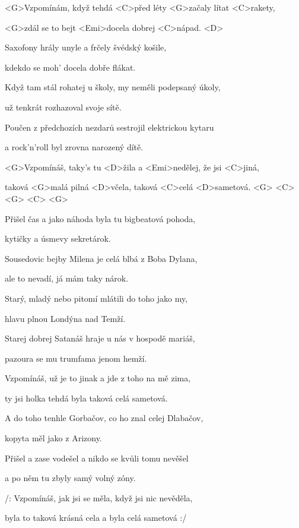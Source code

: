 

\zs
<G>Vzpomínám, když tehdá <C>před léty
<G>začaly lítat <C>rakety,

<G>zdál se to bejt <Emi>docela dobrej <C>nápad. <D>

Saxofony hrály unyle a frčely švédský košile,

kdekdo se moh' docela dobře flákat.
\ks

\zs
Když tam stál rohatej u školy, my neměli podepsaný úkoly,

už tenkrát rozhazoval svoje sítě.

Poučen z předchozích nezdarů sestrojil elektrickou kytaru

a rock'n'roll byl zrovna narozený dítě.
\ks

\zr
<G>Vzpomínáš, taky's tu <D>žila a <Emi>nedělej, že jsi <C>jiná,

taková <G>malá pilná <D>včela, taková <C>celá <D>sametová. <G> <C> <G> <C> <G>
\kr

\zs
Přišel čas a jako náhoda byla tu bigbeatová pohoda,

kytičky a úsmevy sekretárok.

Sousedovic bejby Milena je celá blbá z Boba Dylana,

ale to nevadí, já mám taky nárok.
\ks

\zs
Starý, mladý nebo pitomí mlátili do toho jako my,

hlavu plnou Londýna nad Temží.

Starej dobrej Satanáš hraje u nás v hospodě mariáš,

pazoura se mu trumfama jenom hemží.
\ks

\zr
Vzpomínáš, už je to jinak a jde z toho na mě zima,

ty jsi holka tehdá byla taková celá sametová.
\kr

\zs
A do toho tenhle Gorbačov, co ho znal celej Dlabačov,

kopyta měl jako z Arizony.

Přišel a zase vodešel a nikdo se kvůli tomu nevěšel

a po něm tu zbyly samý volný zóny.
\ks

\zr
/: Vzpomínáš, jak jsi se měla,
když jsi nic nevěděla,

byla to taková krásná cela a byla celá sametová :/
\kr

\kp

